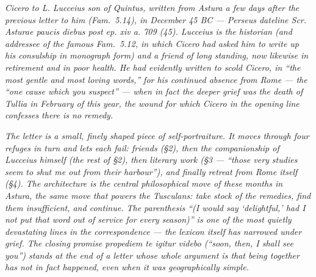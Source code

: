 
\textit{Cicero to L. Lucceius son of Quintus, written from
Astura a few days after the previous letter to him (Fam.\
5.14), in December 45 BC --- Perseus dateline
\textit{Scr. Asturae paucis diebus post ep. xiv a. 709 (45)}.
Lucceius is the historian (and addressee of the famous
\textit{Fam.}\ 5.12, in which Cicero had asked him to write
up his consulship in monograph form) and a friend of long
standing, now likewise in retirement and in poor health. He
had evidently written to scold Cicero, in ``the most gentle
and most loving words,'' for his continued absence from
Rome --- the ``one cause which you suspect'' --- when in
fact the deeper grief was the death of Tullia in February
of this year, the wound for which Cicero in the opening
line confesses there is no remedy.}

\textit{The letter is a small, finely shaped piece of
self-portraiture. It moves through four refuges in turn
and lets each fail: friends (\S 2), then the
companionship of Lucceius himself (the rest of \S 2),
then literary work (\S 3 --- ``those very studies seem to
shut me out from their harbour''), and finally retreat
from Rome itself (\S 4). The architecture is the central
philosophical move of these months in Astura, the same
move that powers the \textit{Tusculans}: take stock of the
remedies, find them insufficient, and continue. The
parenthesis ``(I would say `delightful,' had I not put
that word out of service for every season)'' is one of
the most quietly devastating lines in the
correspondence --- the lexicon itself has narrowed under
grief. The closing promise \textit{propediem te igitur
videbo} (``soon, then, I shall see you'') stands at the
end of a letter whose whole argument is that being
together has not in fact happened, even when it was
geographically simple.}

